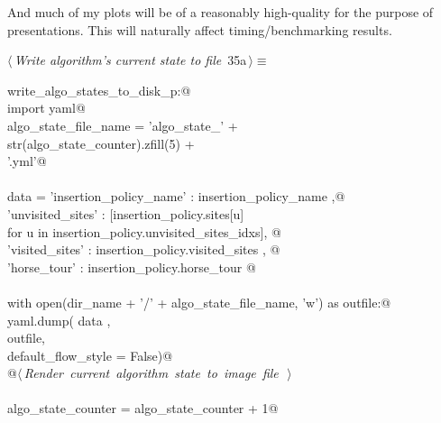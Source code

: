 \documentclass[11.5pt]{report}
\begin{document}
And much of my plots will be of a reasonably high-quality for the purpose of presentations. This will naturally 
affect timing/benchmarking results. 

\begin{flushleft} \small\label{scrap29}\raggedright\small
{} $\langle\,${\itshape Write algorithm's current state to file}\nobreak\ {\footnotesize {35a}}$\,\rangle\equiv$
\vspace{-1ex}
\begin{list}{}{} \item
\mbox{}\verb@if write_algo_states_to_disk_p:@\\
\mbox{}\verb@     import yaml@\\
\mbox{}\verb@     algo_state_file_name = 'algo_state_'                    + \@\\
\mbox{}\verb@                       str(algo_state_counter).zfill(5) + \@\\
\mbox{}\verb@                       '.yml'@\\
\mbox{}\verb@@\\
\mbox{}\verb@     data = {'insertion_policy_name' : insertion_policy_name                       ,@\\
\mbox{}\verb@             'unvisited_sites'       : [insertion_policy.sites[u] \@\\
\mbox{}\verb@                                            for u in insertion_policy.unvisited_sites_idxs], @\\
\mbox{}\verb@             'visited_sites'         : insertion_policy.visited_sites                    , @\\
\mbox{}\verb@             'horse_tour'            : insertion_policy.horse_tour }@\\
\mbox{}\verb@@\\
\mbox{}\verb@     with open(dir_name + '/' + algo_state_file_name, 'w') as outfile:@\\
\mbox{}\verb@          yaml.dump( data   , \@\\
\mbox{}\verb@                     outfile, \@\\
\mbox{}\verb@                     default_flow_style = False)@\\
\mbox{}\verb@          @\hbox{$\langle\,${\itshape Render current algorithm state to image file}\nobreak\ {\footnotesize {}}$\,\rangle$}\verb@@\\
\mbox{}\verb@@\\
\mbox{}\verb@     algo_state_counter = algo_state_counter + 1@\\

\end{list}
\end{flushleft}
\end{document}
